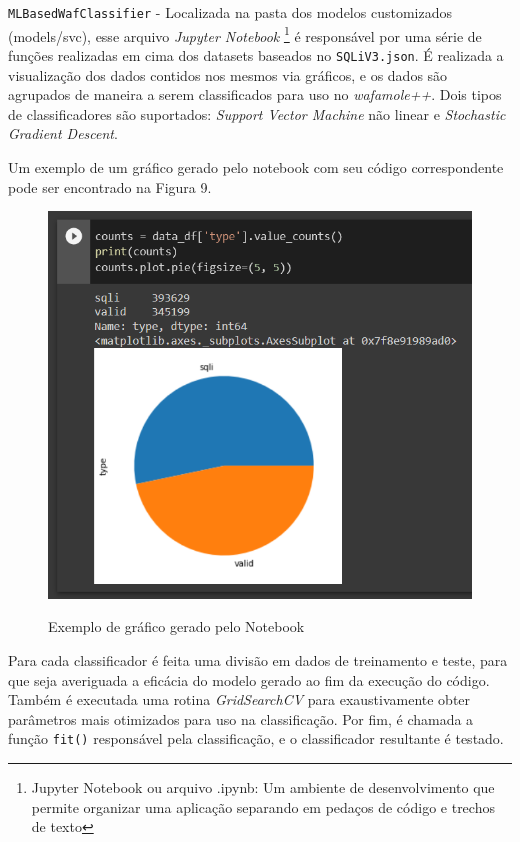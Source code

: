 \begin{alineas}
\begin{alineas}
\end{alineas}
\item \verb+MLBasedWafClassifier+ - Localizada na pasta dos modelos customizados (models/svc), esse arquivo \textit{Jupyter Notebook} \footnote{Jupyter Notebook ou arquivo .ipynb: Um ambiente de desenvolvimento que permite organizar uma aplicação separando em pedaços de código e trechos de texto} é responsável por uma série de funções realizadas em cima dos datasets baseados no \verb+SQLiV3.json+. É realizada a visualização dos dados contidos nos mesmos via gráficos, e os dados são agrupados de maneira a serem classificados para uso no \textit{wafamole++}. Dois tipos de classificadores são suportados: \textit{Support Vector Machine} não linear e \textit{Stochastic Gradient Descent}. 

Um exemplo de um gráfico gerado pelo notebook com seu código correspondente pode ser encontrado na Figura 9.

\begin{figure}[ht]
    \centering
    \caption{Exemplo de gráfico gerado pelo Notebook}
    \includegraphics[width=16cm]{figuras/exemplo_grafico_notebook.png} 
    \label{fig:internet} 
\end{figure}

Para cada classificador é feita uma divisão em dados de treinamento e teste, para que seja averiguada a eficácia do modelo gerado ao fim da execução do código. Também é executada uma rotina \textit{GridSearchCV} para exaustivamente obter parâmetros mais otimizados para uso na classificação. Por fim, é chamada a função \verb+fit()+ responsável pela classificação, e o classificador resultante é testado. 


\end{alineas}
